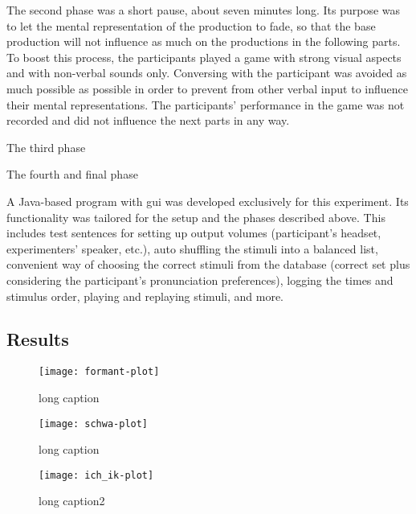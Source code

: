 The second phase was a short pause, about seven minutes long.
Its purpose was to let the mental representation of the production to fade, so that the base production will not influence as much on the productions in the following parts.
To boost this process, the participants played a game with strong visual aspects and with non-verbal sounds only.
Conversing with the participant was avoided as much possible as possible in order to prevent from other verbal input to influence their mental representations.
The participants' performance in the game was not recorded and did not influence the next parts in any way.

The third phase

The fourth and final phase

A Java-based program with \ac{gui} was developed exclusively for this experiment.
Its functionality was tailored for the setup and the phases described above.
This includes test sentences for setting up output volumes (participant's headset, experimenters' speaker, etc.), auto shuffling the stimuli into a balanced list, convenient way of choosing the correct stimuli from the database (correct set plus considering the participant's pronunciation preferences), logging the times and stimulus order, playing and replaying stimuli, and more.

\subsection{Results}
\label{subsec:results_hci}

\begin{figure}[!t]
	\centering
	\texttt{[image: formant-plot]}
	\caption[short caption]{long caption}
	\label{fig:HCIConvFormants}
\end{figure}


\begin{figure}[!t]
	\centering
	\texttt{[image: schwa-plot]}
	\caption[short caption]{long caption}
	\label{fig:HCIConvSchwaPlot}
\end{figure}

\begin{figure}[!t]
	\centering
	\texttt{[image: ich\_ik-plot]}
	\caption[short caption]{long caption2}
	\label{fig:HCIConvIcIkPlot}
\end{figure}

